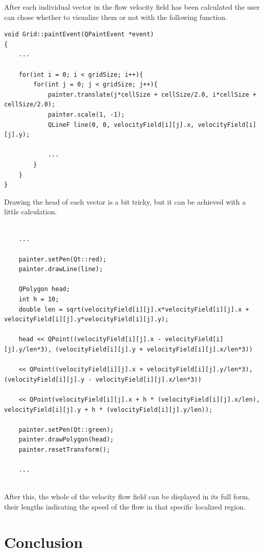 \documentclass[12pt, titlepage]{article}
\begin{document}
After each individual vector in the flow velocity field has been calculated the user can chose whether to visualize them or not with the following function.

\begin{lstlisting}
void Grid::paintEvent(QPaintEvent *event)
{
    ...
    
    for(int i = 0; i < gridSize; i++){
        for(int j = 0; j < gridSize; j++){
            painter.translate(j*cellSize + cellSize/2.0, i*cellSize + cellSize/2.0);
            painter.scale(1, -1);
            QLineF line(0, 0, velocityField[i][j].x, velocityField[i][j].y);
            
            ...
        }
    }
}
\end{lstlisting}

Drawing the head of each vector is a bit tricky, but it can be achieved with a little calculation.

\begin{lstlisting}
	
	...
	
	painter.setPen(Qt::red);
    painter.drawLine(line);
            
	QPolygon head;
	int h = 10;
    double len = sqrt(velocityField[i][j].x*velocityField[i][j].x + velocityField[i][j].y*velocityField[i][j].y);
    
    head << QPoint((velocityField[i][j].x - velocityField[i][j].y/len*3), (velocityField[i][j].y + velocityField[i][j].x/len*3)) 
    
    << QPoint((velocityField[i][j].x + velocityField[i][j].y/len*3), (velocityField[i][j].y - velocityField[i][j].x/len*3))
    
    << QPoint(velocityField[i][j].x + h * (velocityField[i][j].x/len), velocityField[i][j].y + h * (velocityField[i][j].y/len));
    
    painter.setPen(Qt::green);
    painter.drawPolygon(head);
    painter.resetTransform();
    
    ...
    
\end{lstlisting}

After this, the whole of the velocity flow field can be displayed in its full form, their lengths  indicating the speed of the flow in that specific localized region.

\pagebreak

\section{Conclusion}
\end{document}
